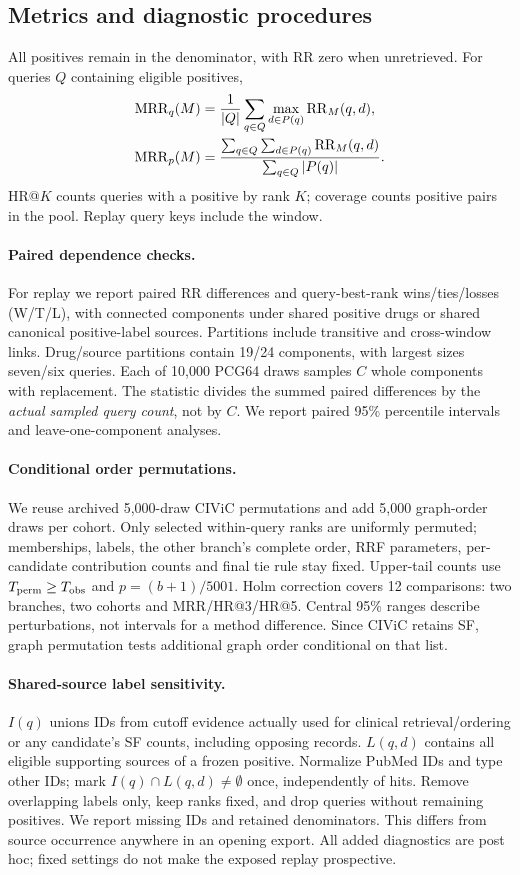 \subsection{Metrics and diagnostic procedures}
\label{sec:implementation}
All positives remain in the denominator, with RR zero when unretrieved. For queries $Q$ containing eligible positives,
\begin{align}
\mathrm{MRR}_{q}(M)&=\frac{1}{|Q|}\sum_{q\in Q}\max_{d\in P(q)}\operatorname{RR}_M(q,d),\label{eq:mrr}\\
\mathrm{MRR}_{p}(M)&=\frac{\sum_{q\in Q}\sum_{d\in P(q)}\operatorname{RR}_M(q,d)}{\sum_{q\in Q}|P(q)|}.\label{eq:pair}
\end{align}
HR@$K$ counts queries with a positive by rank $K$; coverage counts positive pairs in the pool. Replay query keys include the window.

\paragraph{Paired dependence checks.}
For replay we report paired RR differences and query-best-rank wins/ties/losses (W/T/L), with connected components under shared positive drugs or shared canonical positive-label sources. Partitions include transitive and cross-window links. Drug/source partitions contain 19/24 components, with largest sizes seven/six queries. Each of 10,000 PCG64 draws samples $C$ whole components with replacement. The statistic divides the summed paired differences by the \emph{actual sampled query count}, not by $C$. We report paired 95\% percentile intervals and leave-one-component analyses.

\paragraph{Conditional order permutations.}
We reuse archived 5,000-draw CIViC permutations and add 5,000 graph-order draws per cohort. Only selected within-query ranks are uniformly permuted; memberships, labels, the other branch's complete order, RRF parameters, per-candidate contribution counts and final tie rule stay fixed. Upper-tail counts use $T_{\rm perm}\geq T_{\rm obs}$ and $p=(b+1)/5001$. Holm correction covers 12 comparisons: two branches, two cohorts and MRR/HR@3/HR@5. Central 95\% ranges describe perturbations, not intervals for a method difference. Since CIViC retains SF, graph permutation tests additional graph order conditional on that list.

\paragraph{Shared-source label sensitivity.}
$I(q)$ unions IDs from cutoff evidence actually used for clinical retrieval/ordering or any candidate's SF counts, including opposing records. $L(q,d)$ contains all eligible supporting sources of a frozen positive. Normalize PubMed IDs and type other IDs; mark $I(q)\cap L(q,d)\ne\emptyset$ once, independently of hits. Remove overlapping labels only, keep ranks fixed, and drop queries without remaining positives. We report missing IDs and retained denominators. This differs from source occurrence anywhere in an opening export. All added diagnostics are post hoc; fixed settings do not make the exposed replay prospective.
